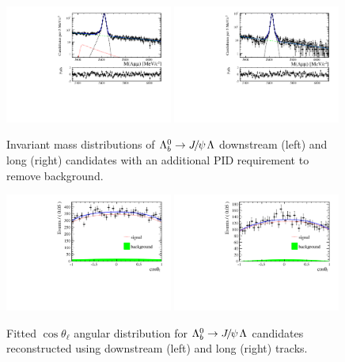 \begin{figure}[h]
\centering
\includegraphics[width=0.49\textwidth]{Lmumu/figs/Jpsi_default_DD_log_fitAndRes.pdf}
\includegraphics[width=0.49\textwidth]{Lmumu/figs/Jpsi_default_LL_log_fitAndRes.pdf}
\caption{Invariant mass distributions of $\Lb\ra\jpsi\Lz$ downstream (left) and long (right)
candidates with an additional PID requirement to remove \KS background. }
\label{fig:Jpsimass_angular}
\end{figure}
%
\begin{figure}[h]
\centering
\includegraphics[width=0.49\textwidth]{Lmumu/figs/AngularDistribs/Fitted/Afb_DD_jpsi.pdf}
\includegraphics[width=0.49\textwidth]{Lmumu/figs/AngularDistribs/Fitted/Afb_LL_jpsi.pdf}
\caption{Fitted $\cos\theta_\ell$ angular distribution for $\Lb\to\jpsi\Lz$ candidates
reconstructed using downstream (left) and long (right) tracks. }
\label{fig:AngFitJpsi}
\end{figure}
